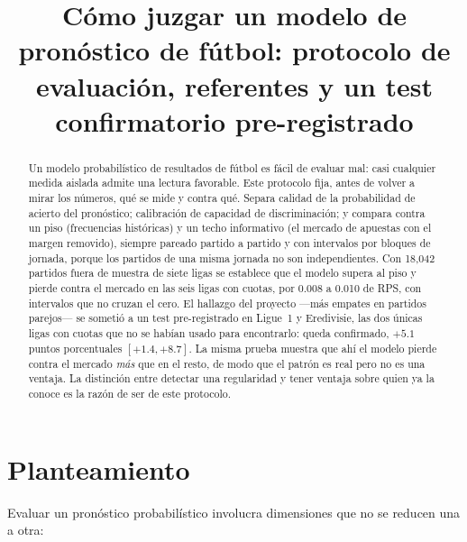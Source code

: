 \documentclass{pas}
\title{Cómo juzgar un modelo de pronóstico de fútbol: protocolo de evaluación, referentes y un test
confirmatorio pre-registrado}
\author[César Carrillo]{\textrm}
\affil{Centro de Investigación en Matemáticas, unidad Aguascalientes}
\begin{document}
\begin{abstract}
Un modelo probabilístico de resultados de fútbol es fácil de evaluar mal: casi cualquier medida aislada admite una
lectura favorable. Este protocolo fija, antes de volver a mirar los números, qué se mide y contra qué. Separa
calidad de la probabilidad de acierto del pronóstico; calibración de capacidad de discriminación; y compara contra
un piso (frecuencias históricas) y un techo informativo (el mercado de apuestas con el margen removido), siempre
pareado partido a partido y con intervalos por bloques de jornada, porque los partidos de una misma jornada no son
independientes. Con 18{,}042 partidos fuera de muestra de siete ligas se establece que el modelo supera al piso y
pierde contra el mercado en las seis ligas con cuotas, por 0.008 a 0.010 de RPS, con intervalos que no cruzan el
cero. El hallazgo del proyecto —más empates en partidos parejos— se sometió a un test pre-registrado en Ligue~1 y
Eredivisie, las dos únicas ligas con cuotas que no se habían usado para encontrarlo: queda confirmado,
$+5.1$ puntos porcentuales $[+1.4, +8.7]$. La misma prueba muestra que ahí el modelo pierde contra el mercado
\emph{más} que en el resto, de modo que el patrón es real pero no es una ventaja. La distinción entre detectar una
regularidad y tener ventaja sobre quien ya la conoce es la razón de ser de este protocolo.
\end{abstract}


\maketitle

\section{Planteamiento}

Evaluar un pronóstico probabilístico involucra dimensiones que no se reducen una a otra:
\end{document}

